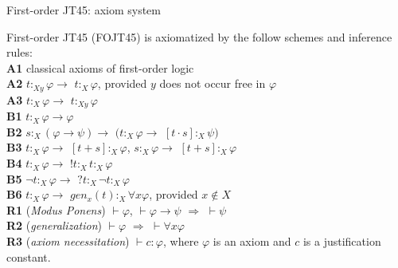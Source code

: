 \documentclass{beamer}
\theoremstyle{definition}
\newcommand{\nao}{\neg}
\newcommand{\impli}{\rightarrow}
\newcommand{\todo}{\forall}
\newcommand{\teo}{\vdash}
\begin{document}
		

	
\begin{frame}{First-order JT45: axiom system}

\qquad First-order JT45 (FOJT45) is axiomatized by the follow schemes and inference rules:\\
 \vspace{5 mm}	
		\textbf{A1} classical axioms of first-order logic\\
		\textbf{A2} $t$$:_{Xy}$$\varphi \impli$ $t$$:_{X}$$\varphi$, provided $y$ does not occur free in $\varphi$\\
		
		\textbf{A3} $t$$:_{X}$$\varphi \impli$ $t$$:_{Xy}$$\varphi$ \\
		
		\textbf{B1} $t$$:_{X}$$\varphi \impli \varphi$\\
		
		\textbf{B2} $s$$:_{X}$$(\varphi \impli \psi) \impli$ $(t$$:_{X}$$\varphi \impli$ $[t\cdot s]$$:_{X}$$\psi)$\\
		
		\textbf{B3} $t$$:_{X}$$\varphi \impli$ $[t+s]$$:_{X}$$\varphi$, $s$$:_{X}$$\varphi \impli$ $[t+s]$$:_{X}$$\varphi$\\ 
		
		\textbf{B4} $t$$:_{X}$$\varphi \impli$ $!t$$:_{X}$$t$$:_{X}$$\varphi$\\
		
		
	{\color{blue} 	\textbf{B5} $\nao t$$:_{X}$$\varphi \impli$ $?t$$:_{X}$$\nao t$$:_{X}$$\varphi$}\\
		
		
		\textbf{B6} $t$$:_{X}$$\varphi \impli$ $gen_{x}(t)$$:_{X}$$ \todo x \varphi$, provided $x \notin X$\\
		
		
		\textbf{R1} (\textit{Modus Ponens}) $\teo \varphi$, $\teo \varphi\impli\psi$ $\Rightarrow$ $\teo \psi$ \\
		
		\textbf{R2} (\textit{generalization})  $\teo \varphi$ $\Rightarrow$ $\teo \todo x \varphi$ \\
		
		\textbf{R3} (\textit{axiom necessitation})  $\teo c$$:$$\varphi$, where $\varphi$ is an axiom and $c$ is a justification constant.\\	
\end{frame}	
	
\end{document}
